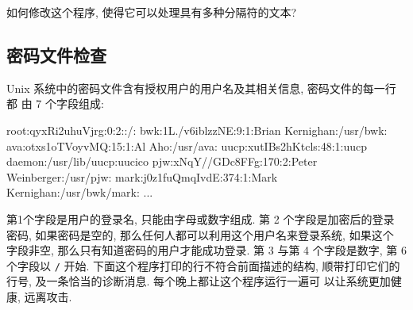 \begin{exercise}
    如何修改这个程序, 使得它可以处理具有多种分隔符的文本?
\end{exercise}

\subsection{密码文件检查}
\label{subsec:password_file checking}

Unix 系统中的密码文件含有授权用户的用户名及其相关信息, 密码文件的每一行都
由 7 个字段组成:
\begin{awkcode}
    root:qyxRi2uhuVjrg:0:2::/:
    bwk:1L./v6iblzzNE:9:1:Brian Kernighan:/usr/bwk:
    ava:otxs1oTVoyvMQ:15:1:Al Aho:/usr/ava:
    uucp:xutIBs2hKtcls:48:1:uucp daemon:/usr/lib/uucp:uucico
    pjw:xNqY//GDc8FFg:170:2:Peter Weinberger:/usr/pjw:
    mark:j0z1fuQmqIvdE:374:1:Mark Kernighan:/usr/bwk/mark:
    ...
\end{awkcode}
第1个字段是用户的登录名, 只能由字母或数字组成. 第 2 个字段是加密后的登录
密码, 如果密码是空的, 那么任何人都可以利用这个用户名来登录系统, 如果这个
字段非空, 那么只有知道密码的用户才能成功登录. 第 3 与第 4 个字段是数字,
第 6 个字段以 \verb'/' 开始. 下面这个程序打印的行不符合前面描述的结构,
顺带打印它们的行号, 及一条恰当的诊断消息. 每个晚上都让这个程序运行一遍可
以让系统更加健康, 远离攻击.
